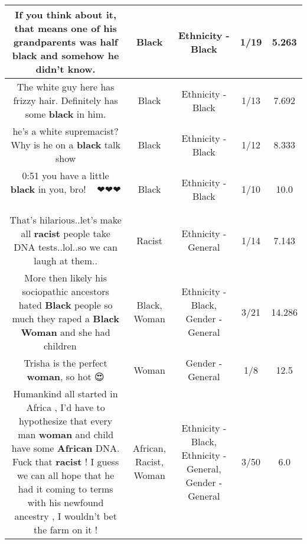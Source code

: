 \documentclass[11pt]{article}
\newlength\mylength
\begin{document}
\begin{center}
\begin{longtable}{|C{.65\mylength}|C{.30\mylength}|C{.12\mylength}|C{.12\mylength}|C{.12\mylength}|}
  \small If you think about it, that means one of his grandparents was half \textbf{black} and somehow he didn't know.\normalsize   & Black & Ethnicity - Black & 1/19 & 5.263 \\  \hline
  \small The white guy here has frizzy hair. Definitely has some \textbf{black} in him.\normalsize   & Black & Ethnicity - Black & 1/13 & 7.692 \\  \hline
  \small he's a white supremacist? Why is he on a \textbf{black} talk show\normalsize   & Black & Ethnicity - Black & 1/12 & 8.333 \\  \hline
  \small 0:51 you have a little \textbf{black} in you, bro! 🤣🤣🤣❤❤❤💓\normalsize   & Black & Ethnicity - Black & 1/10 & 10.0 \\  \hline
  \small That's hilarious..let's make all \textbf{racist} people take DNA tests..lol..so we can laugh at them..\normalsize   & Racist & Ethnicity - General & 1/14 & 7.143 \\  \hline
  \small More then likely his sociopathic ancestors hated \textbf{Black} people so much they raped a \textbf{Black} \textbf{Woman} and she had children 🤷🏾‍♀️\normalsize   & Black, Woman & Ethnicity - Black, Gender - General & 3/21 & 14.286 \\  \hline
  \small Trisha is the perfect \textbf{woman}, so hot 😍\normalsize   & Woman & Gender - General & 1/8 & 12.5 \\  \hline
  \small Humankind all started in Africa ,  I'd have to hypothesize that every man \textbf{woman} and child have some \textbf{African} DNA.  Fuck that \textbf{racist} ! I guess we can all hope that he had it coming to terms with his newfound ancestry , I wouldn't bet the farm on it !\normalsize   & African, Racist, Woman & Ethnicity - Black, Ethnicity - General, Gender - General & 3/50 & 6.0 \\  \hline

\end{longtable}
\end{center}
\end{document}
